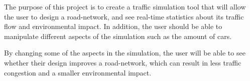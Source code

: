 
The purpose of this project is to create a traffic simulation tool that will allow the user to design a road-network, and see real-time statistics about its traffic flow and environmental impact. In addition, the user should be able to manipulate different aspects of the simulation such as the amount of cars.

 By changing some of the aspects in the simulation, the user will be able to see whether their design improves a road-network, which can result in less traffic congestion and a smaller environmental impact.